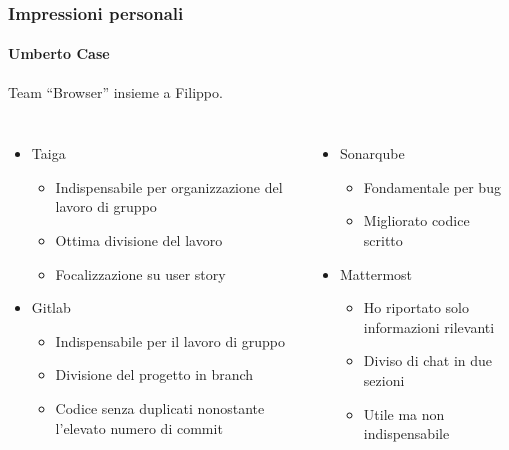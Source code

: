 \documentclass{beamer}
\begin{document}
\begin{frame}
\frametitle{Impressioni personali}
\framesubtitle{Umberto Case}
Team “Browser” insieme a Filippo.
\begin{columns}
\begin{itemize}
	\item Taiga
	\begin{itemize}
		\item Indispensabile per organizzazione del lavoro di gruppo
		\item Ottima divisione del lavoro
		\item Focalizzazione su user story
	\end{itemize}
	\item Gitlab
	\begin{itemize}
		\item Indispensabile per il lavoro di gruppo
		\item Divisione del progetto in branch
		\item Codice senza duplicati nonostante l'elevato numero di commit
	\end{itemize}
\end{itemize}
\begin{itemize}
	\item Sonarqube
	\begin{itemize}
		\item Fondamentale per bug
		\item Migliorato codice scritto
	\end{itemize}
	\item Mattermost
	\begin{itemize}
		\item Ho riportato solo informazioni rilevanti
		\item Diviso di chat in due sezioni
		\item Utile ma non indispensabile
	\end{itemize}
\end{itemize}
\end{columns}
\end{frame}
\end{document}
